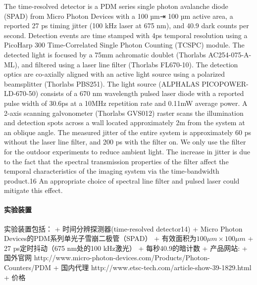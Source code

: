 \documentclass[11pt]{article}
\begin{document}
The time-resolved detector is a PDM series single photon avalanche diode
(SPAD) from Micro Photon Devices with a 100 µm⇥ 100 µm active area, a
reported 27 ps timing jitter (100 kHz laser at 675 nm), and 40.9 dark
counts per second. Detection events are time stamped with 4ps temporal
resolution using a PicoHarp 300 Time-Correlated Single Photon Counting
(TCSPC) module. The detected light is focused by a 75mm achromatic
doublet (Thorlabs AC254-075-A-ML), and filtered using a laser line
filter (Thorlabs FL670-10). The detection optics are co-axially aligned
with an active light source using a polarized beamsplitter (Thorlabs
PBS251). The light source (ALPHALAS PICOPOWER-LD-670-50) consists of a
670 nm wavelength pulsed laser diode with a reported pulse width of
30.6ps at a 10MHz repetition rate and 0.11mW average power. A 2-axis
scanning galvonometer (Thorlabs GVS012) raster scans the illumination
and detection spots across a wall located approximately 2m from the
system at an oblique angle. The measured jitter of the entire system is
approximately 60 ps without the laser line filter, and 200 ps with the
filter on. We only use the filter for the outdoor experiments to reduce
ambient light. The increase in jitter is due to the fact that the
spectral transmission properties of the filter affect the temporal
characteristics of the imaging system via the time-bandwidth product.16
An appropriate choice of spectral line filter and pulsed laser could
mitigate this effect.

    \paragraph{实验装置}\label{ux5b9eux9a8cux88c5ux7f6e}

实验装置包括： + 时间分辨探测器(time-resolved detector14) + Micro Photon
Devices的PDM系列单光子雪崩二极管（SPAD） +
有效面积为\(100μm\times 100μm\) + 27 ps定时抖动（675 nm处的100 kHz激光）
+ 每秒40.9的暗计数 + 产品网站: + 国外官网
http://www.micro-photon-devices.com/Products/Photon-Counters/PDM +
国内代理 http://www.etsc-tech.com/article-show-39-1829.html + 价格
\end{document}
